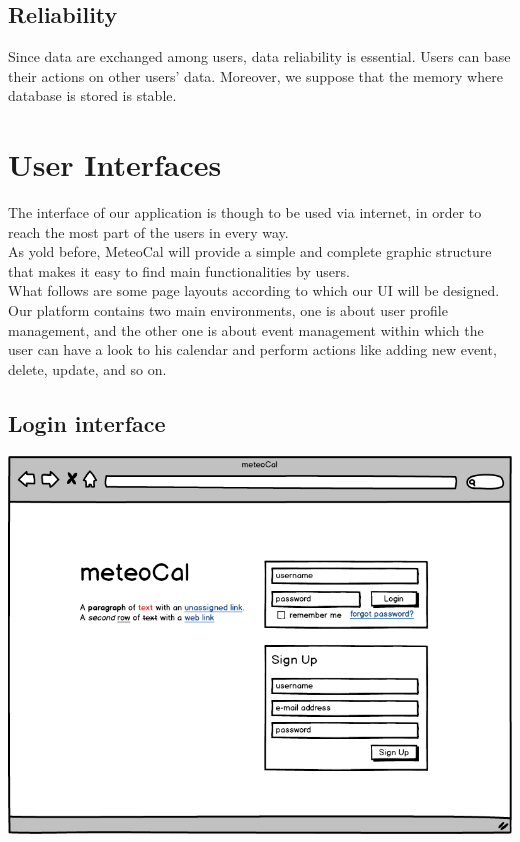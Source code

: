 \documentclass[12pt]{book}
\begin{document}
	\subsection{Reliability}
		Since data are exchanged among users, data reliability is essential. Users can base their actions on other users' data. Moreover, we suppose that the memory where database is stored is stable. 
\section{User Interfaces}
The interface of our application is though to be used via internet, in order to reach the most part of the users in every way. \\
As yold before, MeteoCal will provide a simple and complete graphic structure that makes it easy to find main functionalities by users. \\
What follows are some page layouts according to which our UI will be designed.\\
Our platform contains two main environments, one is about user profile management, and the other one is about event management within which the user can have a look to his calendar and perform actions like adding new event, delete, update, and so on. \\

\subsection{Login interface}
\begin{center}
\includegraphics[scale=0.4]{mockup_home}
\end{center}
\end{document}
